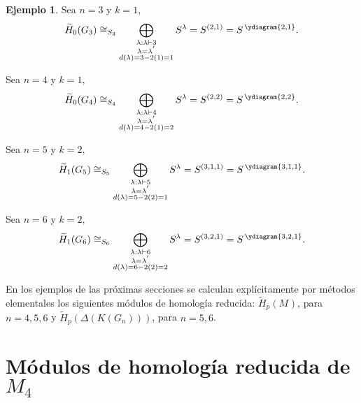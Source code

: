 \documentclass[12pt]{book}
\theoremstyle{definition}
\newtheorem{example}[theorem]{Ejemplo}
\newcounter{in}
\begin{document}
\begin{example}
  \quad

  Sea $n=3$ y $k=1$, 
  \begin{equation*}
    \widetilde H_{0}(G_{3})\cong_{S_{3}}\bigoplus_{\substack{\lambda:\lambda\vdash 3\\
        \lambda=\lambda^{'}\\d(\lambda)=3-2(1)=1}} S^{\lambda}=S^{(2,1)}=S^{\,\ydiagram{2,1}}.
  \end{equation*}
          
  Sea $n=4$ y $k=1$,
  \begin{equation*}
    \widetilde H_{0}(G_{4})\cong_{S_{4}}\bigoplus_{\substack{\lambda:\lambda\vdash 4\\
        \lambda=\lambda^{'}\\d(\lambda)=4-2(1)=2}} S^{\lambda}=S^{(2,2)}=S^{\,\ydiagram{2,2}}.
  \end{equation*}

  Sea $n=5$ y $k=2$,
  \begin{equation*}
    \widetilde H_{1}(G_{5})\cong_{S_{5}}\bigoplus_{\substack{\lambda:\lambda\vdash 5\\
        \lambda=\lambda^{'}\\d(\lambda)=5-2(2)=1}} S^{\lambda}=S^{(3,1,1)}=S^{\,\ydiagram{3,1,1}}.
  \end{equation*}
        
  Sea $n=6$ y $k=2$,
  \begin{equation*}
    \widetilde H_{1}(G_{6})\cong_{S_{6}}\bigoplus_{\substack{\lambda:\lambda\vdash 6\\
        \lambda=\lambda^{'}\\d(\lambda)=6-2(2)=2}} S^{\lambda}=S^{(3,2,1)}=S^{\,\ydiagram{3,2,1}}.
  \end{equation*}
\end{example}

En los ejemplos de las próximas secciones se calculan explícitamente
por métodos elementales los siguientes módulos de homología reducida: $\widetilde
H_{p}(M_{})$, para $n=4,5,6$ y $\widetilde H_{p}(\Delta(K(G_{n})))$, para $n=5,6$.

\section{Módulos de homología reducida de $M_{4}$}
\label{hom-red-M4}
\end{document}

